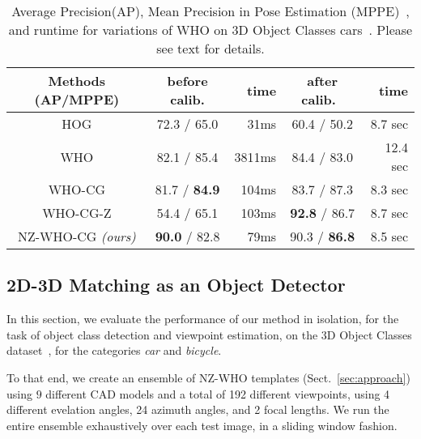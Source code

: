 \begin{table}[!htbp]
  \footnotesize
  \setlength{\tabcolsep}{1pt}
  \centering
  \begin{tabular}{|c|c|r|c|r|}
    \hline
    Methods (AP/MPPE) & before calib.  & time & after calib.~\cite{Aubry14} & time \\
    \hline\hline
    HOG\cite{Dalal05}     & 72.3 / 65.0           &  31ms  & 60.4 / 50.2                 & 8.7 sec \\ 
    WHO\cite{Hariharan12} & 82.1 / 85.4           &  3811ms& 84.4 / 83.0                 & 12.4 sec  \\
    WHO-CG                & 81.7 / \textbf{84.9}  &  104ms & 83.7 / 87.3                 & 8.3 sec \\
    WHO-CG-Z              & 54.4 / 65.1           &  103ms & \textbf{92.8} / 86.7        & 8.7 sec  \\
    NZ-WHO-CG {\em (ours)}  & \textbf{90.0} / 82.8  &   79ms & 90.3 / \textbf{86.8}        & 8.5 sec   \\
    \hline
  \end{tabular}
  \caption{Average Precision(AP), Mean Precision in Pose Estimation
    (MPPE)~\cite{Lopez-Sastre11}, and runtime for variations of WHO on
    3D Object Classes cars~\cite{Savarese07}. Please see text for
    details.}
  \label{tab:who_initializations}
\end{table}


\subsection{2D-3D Matching as an Object Detector} 
\label{sec:exp_iso}
In this section, we evaluate the performance of our method in
isolation, for the task of object class detection and viewpoint
estimation, on the 3D Object Classes dataset~\cite{Savarese07}, for the
categories {\em car} and {\em bicycle}.

To that end, we create an ensemble of NZ-WHO templates (Sect.~\ref{sec:approach})
using $9$ different CAD models and a total of 192 different
viewpoints, using 4 different evelation angles, 24 azimuth angles,
and 2 focal lengths. We run the entire ensemble exhaustively over
each test image, in a sliding window fashion.

